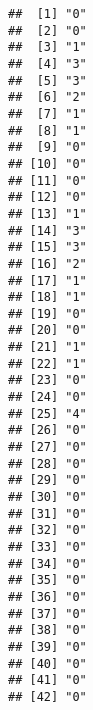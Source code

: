 \documentclass[
]{article}
\begin{document}
\begin{verbatim}
##  [1] "0"                                                  
##  [2] "0"                                                  
##  [3] "1"                                                  
##  [4] "3"                                                  
##  [5] "3"                                                  
##  [6] "2"                                                  
##  [7] "1"                                                  
##  [8] "1"                                                  
##  [9] "0"                                                  
## [10] "0"                                                  
## [11] "0"                                                  
## [12] "0"                                                  
## [13] "1"                                                  
## [14] "3"                                                  
## [15] "3"                                                  
## [16] "2"                                                  
## [17] "1"                                                  
## [18] "1"                                                  
## [19] "0"                                                  
## [20] "0"                                                  
## [21] "1"                                                  
## [22] "1"                                                  
## [23] "0"                                                  
## [24] "0"                                                  
## [25] "4"                                                  
## [26] "0"                                                  
## [27] "0"                                                  
## [28] "0"                                                  
## [29] "0"                                                  
## [30] "0"                                                  
## [31] "0"                                                  
## [32] "0"                                                  
## [33] "0"                                                  
## [34] "0"                                                  
## [35] "0"                                                  
## [36] "0"                                                  
## [37] "0"                                                  
## [38] "0"                                                  
## [39] "0"                                                  
## [40] "0"                                                  
## [41] "0"                                                  
## [42] "0"                                                  

\end{verbatim}
\end{document}
